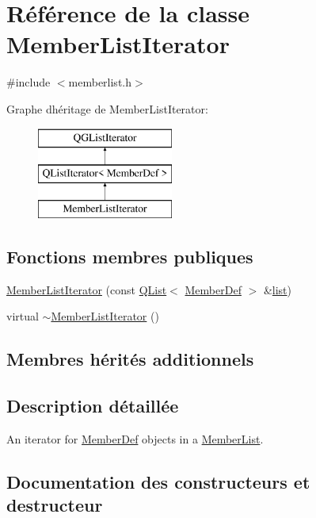 \hypertarget{class_member_list_iterator}{}\section{Référence de la classe Member\+List\+Iterator}
\label{class_member_list_iterator}


{\ttfamily \#include $<$memberlist.\+h$>$}

Graphe d\textquotesingle{}héritage de Member\+List\+Iterator\+:\begin{figure}[H]
\begin{center}
\leavevmode
\includegraphics[height=3.000000cm]{class_member_list_iterator}
\end{center}
\end{figure}
\subsection*{Fonctions membres publiques}
\begin{DoxyCompactItemize}
\item 
\hyperlink{class_member_list_iterator_a01d6b83bbaed02b95f6b64a05828b1a6}{Member\+List\+Iterator} (const \hyperlink{class_q_list}{Q\+List}$<$ \hyperlink{class_member_def}{Member\+Def} $>$ \&\hyperlink{class_q_g_list_iterator_a6e606950ab50b273e8370d9e24756bf2}{list})
\item 
virtual \hyperlink{class_member_list_iterator_a65e6f70ecd550ba79412c4b33b2f5b6d}{$\sim$\+Member\+List\+Iterator} ()
\end{DoxyCompactItemize}
\subsection*{Membres hérités additionnels}


\subsection{Description détaillée}
An iterator for \hyperlink{class_member_def}{Member\+Def} objects in a \hyperlink{class_member_list}{Member\+List}. 

\subsection{Documentation des constructeurs et destructeur}
\hypertarget{class_member_list_iterator_a01d6b83bbaed02b95f6b64a05828b1a6}{}
